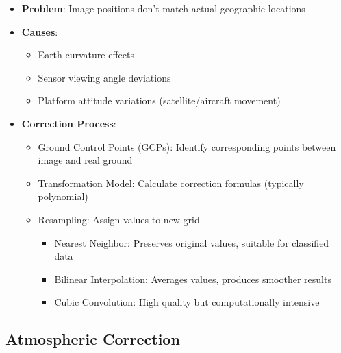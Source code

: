 \documentclass[
  letterpaper,
]{scrbook}
\providecommand{\tightlist}{%
  \setlength{\itemsep}{0pt}\setlength{\parskip}{0pt}}\usepackage{longtable,booktabs,array}
\begin{document}
\begin{itemize}
\tightlist
\item
  \textbf{Problem}: Image positions don't match actual geographic
  locations
\item
  \textbf{Causes}:

  \begin{itemize}
  \tightlist
  \item
    Earth curvature effects
  \item
    Sensor viewing angle deviations
  \item
    Platform attitude variations (satellite/aircraft movement)
  \end{itemize}
\item
  \textbf{Correction Process}:

  \begin{itemize}
  \tightlist
  \item
    Ground Control Points (GCPs): Identify corresponding points between
    image and real ground
  \item
    Transformation Model: Calculate correction formulas (typically
    polynomial)
  \item
    Resampling: Assign values to new grid

    \begin{itemize}
    \tightlist
    \item
      Nearest Neighbor: Preserves original values, suitable for
      classified data
    \item
      Bilinear Interpolation: Averages values, produces smoother results
    \item
      Cubic Convolution: High quality but computationally intensive
    \end{itemize}
  \end{itemize}
\end{itemize}

\subsection{Atmospheric Correction}\label{atmospheric-correction}
\end{document}
